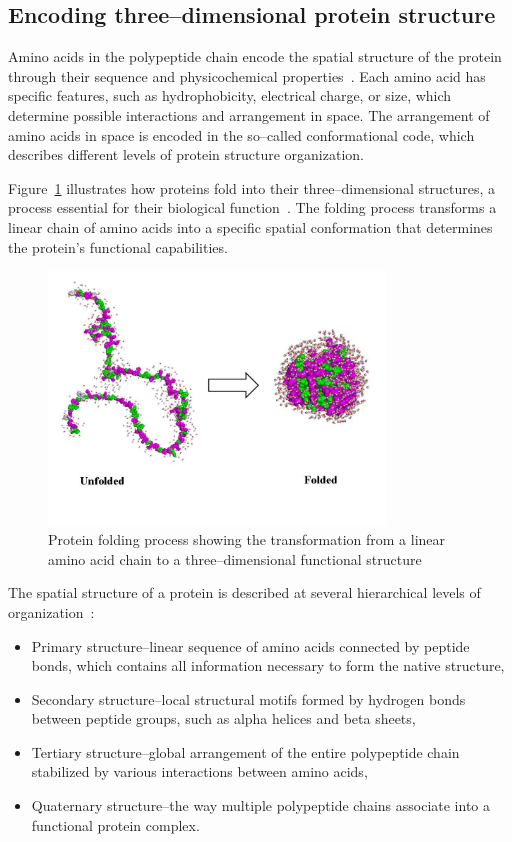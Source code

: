 \subsection{Encoding three--dimensional protein structure}
Amino acids in the polypeptide chain encode the spatial structure of the protein through their sequence and physicochemical properties~\cite{protein_folding}.
Each amino acid has specific features, such as hydrophobicity, electrical charge, or size, which determine possible interactions and arrangement in space.
The arrangement of amino acids in space is encoded in the so--called conformational code, which describes different levels of protein structure organization.

Figure~\ref{fig:protein-folding} illustrates how proteins fold into their three--dimensional structures, a process essential for their biological function~\cite{dill2012protein}.
The folding process transforms a linear chain of amino acids into a specific spatial conformation that determines the protein's functional capabilities.

\begin{figure}[htbp]
    \centering
    \includegraphics[width=0.8\textwidth]{images/folded}
    \caption{Protein folding process showing the transformation from a linear amino acid chain to a three--dimensional functional structure}
    \label{fig:protein-folding}
\end{figure}

The spatial structure of a protein is described at several hierarchical levels of organization~\cite{protein_folding, dill2012protein}:

\begin{itemize}
    \item Primary structure--linear sequence of amino acids connected by peptide bonds, which contains all information necessary to form the native structure,
    \item Secondary structure--local structural motifs formed by hydrogen bonds between peptide groups, such as alpha helices and beta sheets,
    \item Tertiary structure--global arrangement of the entire polypeptide chain stabilized by various interactions between amino acids,
    \item Quaternary structure--the way multiple polypeptide chains associate into a functional protein complex.
\end{itemize}

